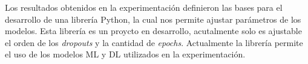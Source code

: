 Los resultados obtenidos en la experimentaci\'{o}n definieron las bases para el desarrollo de una librer\'{i}a Python, la cual nos permite ajustar par\'{a}metros de los modelos. Esta librer\'{i}a es un proycto en desarrollo, acutalmente solo es ajustable el orden de los \textit{dropouts} y la cantidad de \textit{epochs}. Actualmente la librer\'{i}a permite el uso de los modelos ML y DL utilizados en la experimentaci\'{o}n.
